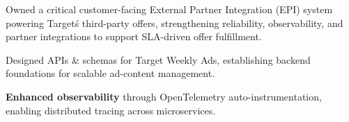 \documentclass[]{deedy-resume-openfont}
\begin{document}
\begin{tightemize}
\item \textcolor{subheadings}{Owned a critical customer-facing External Partner Integration (EPI) system powering Target\'s third-party offers, strengthening reliability, observability, and partner integrations to support SLA-driven offer fulfillment.}
\item \textcolor{subheadings}{Designed APIs \& schemas for Target Weekly Ads, establishing backend foundations for scalable ad-content management.}
\item \textcolor{subheadings}{\textbf{Enhanced observability} through OpenTelemetry auto-instrumentation, enabling distributed tracing across microservices.}
\end{tightemize}
\vspace{4mm}
\end{document}
